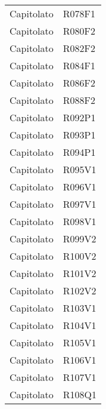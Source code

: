 \documentclass[../analisi-dei-requisiti.tex]{subfiles}
\begin{document}
\begin{longtable}[H]{ p{4cm} | p{4cm} }
  Capitolato                    & R078F1                               \\
  Capitolato                    & R080F2                               \\
  Capitolato                    & R082F2                               \\
  Capitolato                    & R084F1                               \\
  Capitolato                    & R086F2                               \\
  Capitolato                    & R088F2                               \\
  Capitolato                    & R092P1                               \\
  Capitolato                    & R093P1                               \\
  Capitolato                    & R094P1                               \\
  Capitolato                    & R095V1                               \\
  Capitolato                    & R096V1                               \\
  Capitolato                    & R097V1                               \\
  Capitolato                    & R098V1                               \\
  Capitolato                    & R099V2                               \\
  Capitolato                    & R100V2                               \\
  Capitolato                    & R101V2                               \\
  Capitolato                    & R102V2                               \\
  Capitolato                    & R103V1                               \\
  Capitolato                    & R104V1                               \\
  Capitolato                    & R105V1                               \\
  Capitolato                    & R106V1                               \\
  Capitolato                    & R107V1                               \\
  Capitolato                    & R108Q1                               \\

\end{longtable}
\end{document}

